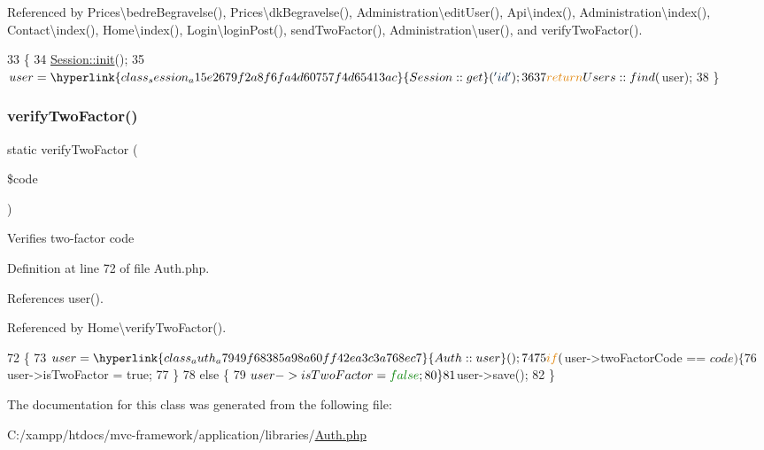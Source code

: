 Referenced by Prices\textbackslash{}bedre\+Begravelse(), Prices\textbackslash{}dk\+Begravelse(), Administration\textbackslash{}edit\+User(), Api\textbackslash{}index(), Administration\textbackslash{}index(), Contact\textbackslash{}index(), Home\textbackslash{}index(), Login\textbackslash{}login\+Post(), send\+Two\+Factor(), Administration\textbackslash{}user(), and verify\+Two\+Factor().


\begin{DoxyCode}
33                                   \{
34         \hyperlink{class_session_a9f0be6ae273d3669e11c29910a0be338}{Session::init}();
35         $user = \hyperlink{class_session_a15e2679f2a8f6fa4d60757f4d65413ac}{Session::get}(\textcolor{stringliteral}{'id'});
36         
37         \textcolor{keywordflow}{return} Users::find($user);
38     \}
\end{DoxyCode}
\hypertarget{class_auth_a44cd32430eda0860d3d5a4e4a210a106}{}\label{class_auth_a44cd32430eda0860d3d5a4e4a210a106} 
\subsubsection{\texorpdfstring{verify\+Two\+Factor()}{verifyTwoFactor()}}
{\footnotesize\ttfamily static verify\+Two\+Factor (\begin{DoxyParamCaption}\item[{}]{\$code }\end{DoxyParamCaption})\hspace{0.3cm}{\ttfamily [static]}}

Verifies two-\/factor code 

Definition at line 72 of file Auth.\+php.



References user().



Referenced by Home\textbackslash{}verify\+Two\+Factor().


\begin{DoxyCode}
72                                                   \{
73         $user = \hyperlink{class_auth_a7949f68385a98a60ff42ea3c3a768ec7}{Auth::user}();
74 
75         \textcolor{keywordflow}{if} ($user->twoFactorCode == $code) \{
76             $user->isTwoFactor = \textcolor{keyword}{true};
77         \}
78         \textcolor{keywordflow}{else} \{
79             $user->isTwoFactor = \textcolor{keyword}{false};
80         \}
81         $user->save();
82     \}
\end{DoxyCode}


The documentation for this class was generated from the following file\+:\begin{DoxyCompactItemize}
\item 
C\+:/xampp/htdocs/mvc-\/framework/application/libraries/\hyperlink{_auth_8php}{Auth.\+php}\end{DoxyCompactItemize}
